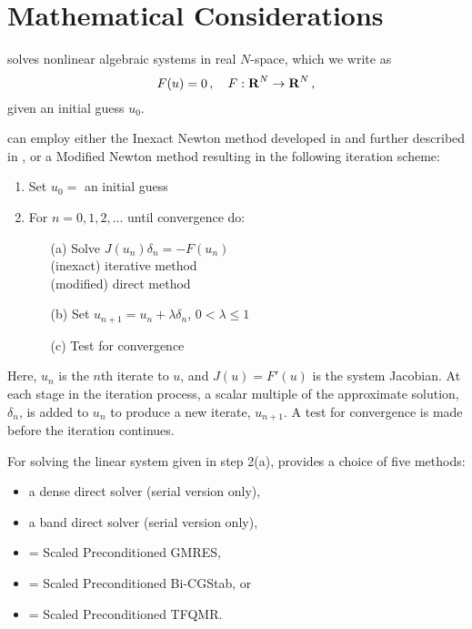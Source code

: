 \chapter{Mathematical Considerations}\label{s:math}

{\kinsol} solves nonlinear algebraic systems in real $N$-space, which
we write as 
\begin{equation}\label{nonlinear_system}
  F(u) = 0 \, , \quad F:\mbox{\bf R}^N \rightarrow \mbox{\bf R}^N \, ,
\end{equation}
given an initial guess $u_0$. 

{\kinsol} can employ either the Inexact Newton method developed in
\cite{Bro:87,BrSa:90,DES:82} and further described in
\cite{DeSc:96,Kel:95}, or a Modified Newton method resulting in the
following iteration scheme:

 \vspace{1ex}
\begin{enumerate}
   \item Set $u_0 = $ an initial guess
   \item For $n = 0, 1, 2,...$ until convergence do:
      \begin{itemize}
          \item[(a)] Solve $J(u_n)\delta_n = -F(u_n)$ \label{e:Newton} \\
                     (inexact) iterative method \\
	             (modified) direct method
          \item[(b)] Set $u_{n+1} = u_n + \lambda \delta_n$,
          $0 < \lambda \leq 1$
          \item[(c)] Test for convergence
      \end{itemize}
\end{enumerate}
Here, $u_n$ is the $n$th iterate to $u$, and $J(u) = F'(u)$ is the system
Jacobian. At each stage in the iteration process, a scalar multiple of the approximate
solution, $\delta_n$, is added to $u_n$ to produce a new iterate, $u_{n+1}$.
A test for convergence is made before the iteration continues.

For solving the linear system given in step 2(a), {\kinsol} provides
a choice of five methods:
\begin{itemize}
\item a dense direct solver (serial version only),
\item a band direct solver (serial version only),
\item {\spgmr} = Scaled Preconditioned GMRES,
\item {\spbcg} = Scaled Preconditioned Bi-CGStab, or
\item {\sptfqmr} = Scaled Preconditioned TFQMR.
\end{itemize}

